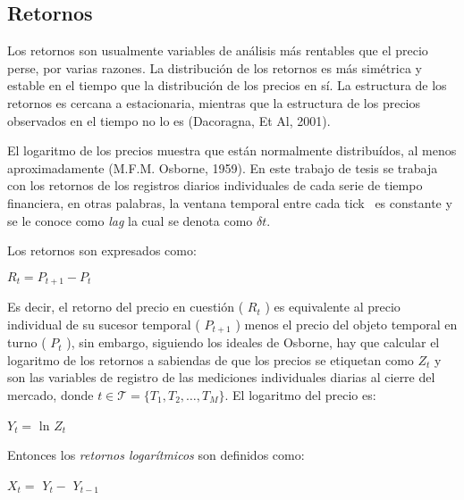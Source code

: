 \subsection{Retornos} 
Los retornos son usualmente variables de análisis más rentables que el precio perse, por varias razones. La distribución de los retornos es más simétrica y estable en el tiempo que la distribución de los precios en sí. La estructura de los retornos es cercana a estacionaria, mientras que la estructura de los precios observados en el tiempo no lo es (Dacoragna, Et Al, 2001).

El logaritmo de los precios muestra que están normalmente distribuídos, al menos aproximadamente (M.F.M. Osborne, 1959). En este trabajo de tesis se trabaja con los retornos de los registros diarios individuales de cada serie de tiempo financiera, en otras palabras, la ventana temporal entre cada \guillemotleft tick\guillemotright~ es constante y se le conoce como \textit{lag} la cual se denota como $\delta t$. 


Los retornos son expresados como:
\begin{center}
$R_t=P_{t+1}-P_t$
\end{center}
Es decir, el retorno del precio en cuestión ( $R_t$ ) es equivalente al precio individual de su sucesor temporal ( $P_{t+1}$ ) menos el precio del objeto temporal en turno ( $P_t$ ), sin embargo, siguiendo los ideales de Osborne, hay que calcular el logaritmo de los retornos a sabiendas de que los precios se etiquetan como $\mathit{Z_t}$ y son las variables de registro de las mediciones individuales diarias al cierre del mercado, donde \newline $t \in \mathcal{T} = \{\mathit{T_1,T_2,\ldots , T_M}\}$. El logaritmo del precio es:

\begin{center}
$\mathit{Y_{t}} = $ ln $\mathit{Z_{t}}$
\end{center}

Entonces los \textit{retornos logarítmicos} son definidos como: 

\begin{center}
$X_t = $ $\mathit{Y_{t}} - $  $\mathit{Y_{t - 1}}$
\end{center}

